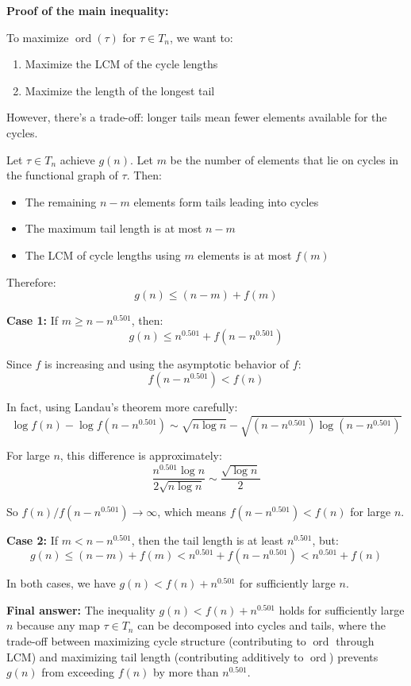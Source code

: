 \documentclass[12pt,a4paper]{article}
\theoremstyle{definition}
\begin{document}
    \textbf{Proof of the main inequality:}

    To maximize $\operatorname{ord}(\tau)$ for $\tau \in T_n$, we want to:
    \begin{enumerate}
        \item Maximize the LCM of the cycle lengths
        \item Maximize the length of the longest tail
    \end{enumerate}

    However, there's a trade-off: longer tails mean fewer elements available for the cycles.

    Let $\tau \in T_n$ achieve $g(n)$. Let $m$ be the number of elements that lie on cycles in the functional graph of $\tau$. Then:
    \begin{itemize}
        \item The remaining $n - m$ elements form tails leading into cycles
        \item The maximum tail length is at most $n - m$
        \item The LCM of cycle lengths using $m$ elements is at most $f(m)$
    \end{itemize}

    Therefore:
    $$g(n) \leq (n - m) + f(m)$$

    \textbf{Case 1:} If $m \geq n - n^{0.501}$, then:
    $$g(n) \leq n^{0.501} + f(n - n^{0.501})$$

    Since $f$ is increasing and using the asymptotic behavior of $f$:
    $$f(n - n^{0.501}) < f(n)$$

    In fact, using Landau's theorem more carefully:
    $$\log f(n) - \log f(n - n^{0.501}) \sim \sqrt{n \log n} - \sqrt{(n - n^{0.501}) \log(n - n^{0.501})}$$

    For large $n$, this difference is approximately:
    $$\frac{n^{0.501} \log n}{2\sqrt{n \log n}} \sim \frac{\sqrt{\log n}}{2}$$

    So $f(n)/f(n - n^{0.501}) \to \infty$, which means $f(n - n^{0.501}) < f(n)$ for large $n$.

    \textbf{Case 2:} If $m < n - n^{0.501}$, then the tail length is at least $n^{0.501}$, but:
    $$g(n) \leq (n - m) + f(m) < n^{0.501} + f(n - n^{0.501}) < n^{0.501} + f(n)$$

    In both cases, we have $g(n) < f(n) + n^{0.501}$ for sufficiently large $n$.

    \textbf{Final answer:} The inequality $g(n) < f(n) + n^{0.501}$ holds for sufficiently large $n$ because any map $\tau \in T_n$ can be decomposed into cycles and tails, where the trade-off between maximizing cycle structure (contributing to $\operatorname{ord}$ through LCM) and maximizing tail length (contributing additively to $\operatorname{ord}$) prevents $g(n)$ from exceeding $f(n)$ by more than $n^{0.501}$.
\end{document}
